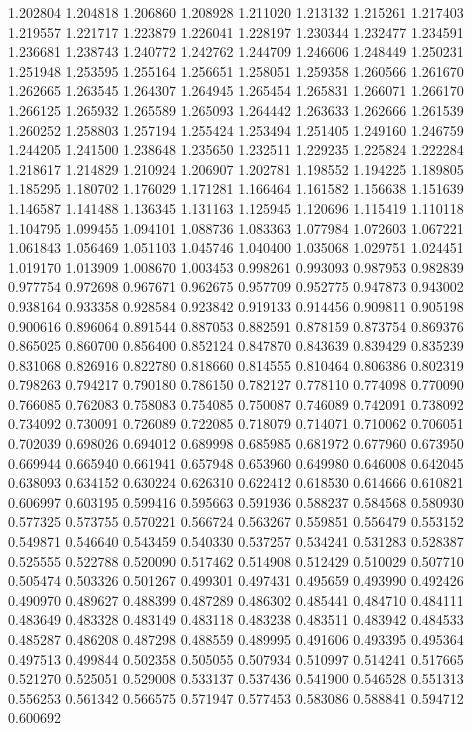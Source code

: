 1.202804
1.204818
1.206860
1.208928
1.211020
1.213132
1.215261
1.217403
1.219557
1.221717
1.223879
1.226041
1.228197
1.230344
1.232477
1.234591
1.236681
1.238743
1.240772
1.242762
1.244709
1.246606
1.248449
1.250231
1.251948
1.253595
1.255164
1.256651
1.258051
1.259358
1.260566
1.261670
1.262665
1.263545
1.264307
1.264945
1.265454
1.265831
1.266071
1.266170
1.266125
1.265932
1.265589
1.265093
1.264442
1.263633
1.262666
1.261539
1.260252
1.258803
1.257194
1.255424
1.253494
1.251405
1.249160
1.246759
1.244205
1.241500
1.238648
1.235650
1.232511
1.229235
1.225824
1.222284
1.218617
1.214829
1.210924
1.206907
1.202781
1.198552
1.194225
1.189805
1.185295
1.180702
1.176029
1.171281
1.166464
1.161582
1.156638
1.151639
1.146587
1.141488
1.136345
1.131163
1.125945
1.120696
1.115419
1.110118
1.104795
1.099455
1.094101
1.088736
1.083363
1.077984
1.072603
1.067221
1.061843
1.056469
1.051103
1.045746
1.040400
1.035068
1.029751
1.024451
1.019170
1.013909
1.008670
1.003453
0.998261
0.993093
0.987953
0.982839
0.977754
0.972698
0.967671
0.962675
0.957709
0.952775
0.947873
0.943002
0.938164
0.933358
0.928584
0.923842
0.919133
0.914456
0.909811
0.905198
0.900616
0.896064
0.891544
0.887053
0.882591
0.878159
0.873754
0.869376
0.865025
0.860700
0.856400
0.852124
0.847870
0.843639
0.839429
0.835239
0.831068
0.826916
0.822780
0.818660
0.814555
0.810464
0.806386
0.802319
0.798263
0.794217
0.790180
0.786150
0.782127
0.778110
0.774098
0.770090
0.766085
0.762083
0.758083
0.754085
0.750087
0.746089
0.742091
0.738092
0.734092
0.730091
0.726089
0.722085
0.718079
0.714071
0.710062
0.706051
0.702039
0.698026
0.694012
0.689998
0.685985
0.681972
0.677960
0.673950
0.669944
0.665940
0.661941
0.657948
0.653960
0.649980
0.646008
0.642045
0.638093
0.634152
0.630224
0.626310
0.622412
0.618530
0.614666
0.610821
0.606997
0.603195
0.599416
0.595663
0.591936
0.588237
0.584568
0.580930
0.577325
0.573755
0.570221
0.566724
0.563267
0.559851
0.556479
0.553152
0.549871
0.546640
0.543459
0.540330
0.537257
0.534241
0.531283
0.528387
0.525555
0.522788
0.520090
0.517462
0.514908
0.512429
0.510029
0.507710
0.505474
0.503326
0.501267
0.499301
0.497431
0.495659
0.493990
0.492426
0.490970
0.489627
0.488399
0.487289
0.486302
0.485441
0.484710
0.484111
0.483649
0.483328
0.483149
0.483118
0.483238
0.483511
0.483942
0.484533
0.485287
0.486208
0.487298
0.488559
0.489995
0.491606
0.493395
0.495364
0.497513
0.499844
0.502358
0.505055
0.507934
0.510997
0.514241
0.517665
0.521270
0.525051
0.529008
0.533137
0.537436
0.541900
0.546528
0.551313
0.556253
0.561342
0.566575
0.571947
0.577453
0.583086
0.588841
0.594712
0.600692

